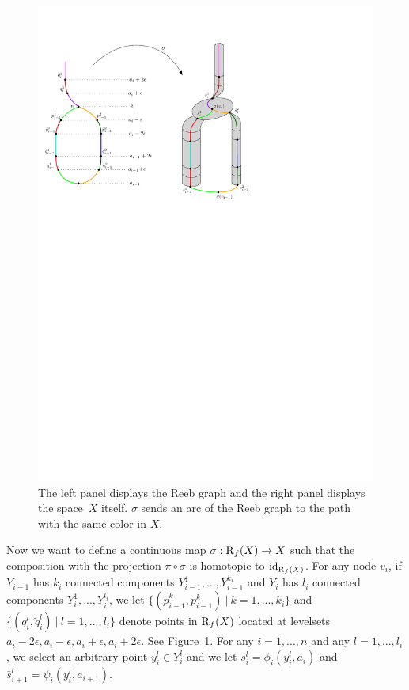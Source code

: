 \begin{figure}[htb]
\begin{center}
\includegraphics[width=13cm]{figures/Sections}
\caption[Images of paths in Reeb graph]{\label{fig:contsect}
The left panel displays the Reeb graph and the right panel displays
the space~$X$ itself.
$\sigma$ sends an arc of the Reeb graph to the path with the same color in $X$. }
\end{center}
\end{figure}

Now we want to define a continuous map $\sigma:\mathrm{R}_f(X)\rightarrow X$ 
such that the composition with the projection $\pi\circ\sigma$ is homotopic to $\text{id}_{\mathrm{R}_f(X)}$.
For any node $v_i$, if $Y_{i-1}$ has $k_i$ connected components $Y_{i-1}^1,...,Y_{i-1}^{k_i}$ and 
$Y_i$ has $l_i$ connected components $Y_i^1,...,Y_i^{l_i}$, we let $\{(\tilde{p}_{i-1}^k,p_{i-1}^k)\ |\ k=1,...,k_i\}$ 
and $\{(q_i^l,\tilde{q}_i^l)\ |\ l=1,...,l_i\}$ denote points in $\mathrm{R}_f(X)$ located at levelsets 
$a_i-2\epsilon,a_i-\epsilon,a_i+\epsilon,a_i+2\epsilon$.
See Figure~\ref{fig:contsect}.
For any $i=1,...,n$ and any $l=1,...,l_i$,
we select an arbitrary point $y_i^l\in Y_i^l$
and we let $s_i^l=\phi_i(y_i^l,a_i)$
and $\bar{s}_{i+1}^l=\psi_i(y_i^l,a_{i+1})$. \\

